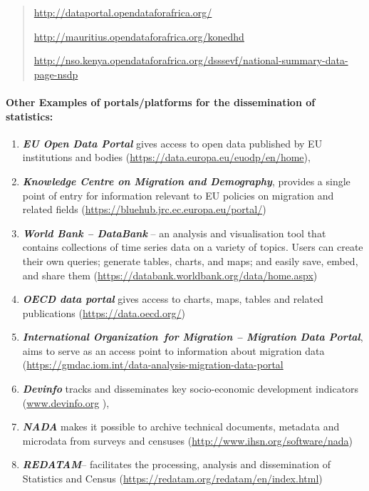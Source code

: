 \documentclass[
]{article}
\begin{document}
\begin{quote}
\url{http://dataportal.opendataforafrica.org/}

\url{http://mauritius.opendataforafrica.org/konedhd}

\url{http://nso.kenya.opendataforafrica.org/dsssevf/national-summary-data-page-nsdp}
\end{quote}

\hypertarget{other-examples-of-portalsplatforms-for-the-dissemination-of-statistics}{%
\paragraph{Other Examples of portals/platforms for the dissemination of statistics:}\label{other-examples-of-portalsplatforms-for-the-dissemination-of-statistics}}

\begin{enumerate}
\def\labelenumi{\roman{enumi}.}
\item
  \textbf{\emph{EU Open Data Portal}} gives access to open data published by EU
  institutions and bodies (\url{https://data.europa.eu/euodp/en/home}),
\item
  \textbf{\emph{Knowledge Centre on Migration and Demography}}, provides a
  single point of entry for information relevant to EU policies on
  migration and related fields
  (\url{https://bluehub.jrc.ec.europa.eu/portal/})
\item
  \textbf{\emph{World Bank -- DataBank}} -- an analysis and visualisation tool
  that contains collections of time series data on a variety of
  topics. Users can create their own queries; generate tables, charts,
  and maps; and easily save, embed, and share them
  (\url{https://databank.worldbank.org/data/home.aspx})
\item
  \textbf{\emph{OECD data portal}} gives access to charts, maps, tables and
  related publications (\url{https://data.oecd.org/})
\item
  \textbf{\emph{International Organization~for Migration -- Migration Data
  Portal}}, aims to serve as an access point to information about
  migration data
  (\url{https://gmdac.iom.int/data-analysis-migration-data-portal}
\item
  \textbf{\emph{Devinfo}} tracks and disseminates key socio-economic development
  indicators (\href{http://www.devinfo.org}{www.devinfo.org} ),
\item
  \textbf{\emph{NADA}} makes it possible to archive technical documents,
  metadata and microdata from surveys and censuses
  (\url{http://www.ihsn.org/software/nada})
\item
  \textbf{\emph{REDATAM}}-- facilitates the processing, analysis and
  dissemination of Statistics and Census
  (\url{https://redatam.org/redatam/en/index.html})
\end{enumerate}
\end{document}
